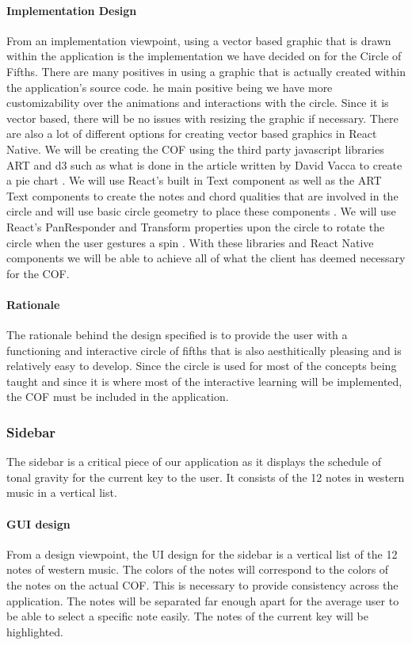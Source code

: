 \documentclass[onecolumn, draftclsnofoot,10pt, compsoc]{IEEEtran}
\begin{document}
\paragraph{Implementation Design}
From an implementation viewpoint, using a vector based graphic that is drawn within the application is the implementation we have decided on for the Circle of Fifths.
There are many positives in using a graphic that is actually created within the application's source code.
he main positive being we have more customizability over the animations and interactions with the circle.
Since it is vector based, there will be no issues with resizing the graphic if necessary.
There are also a lot of different options for creating vector based graphics in React Native.
We will be creating the COF using the third party javascript libraries ART and d3 such as what is done in the article written by David Vacca to create a pie chart \cite{medium}.
We will use React’s built in Text component as well as the ART Text components to create the notes and chord qualities that are involved in the circle and will use basic circle geometry to place these components \cite{react-text} \cite{seb}.
We will use React’s PanResponder and Transform properties upon the circle to rotate the circle when the user gestures a spin \cite{react-pan} \cite{react-transforms}.
With these libraries and React Native components we will be able to achieve all of what the client has deemed necessary for the COF.

\paragraph{Rationale}
The rationale behind the design specified is to provide the user with a functioning and interactive circle of fifths that is also aesthitically pleasing and is relatively easy to develop.
Since the circle is used for most of the concepts being taught and since it is where most of the interactive learning will be implemented, the COF must be included in the application.

\subsubsection{Sidebar}
The sidebar is a critical piece of our application as it displays the schedule of tonal gravity for the current key to the user.
It consists of the 12 notes in western music in a vertical list.

\paragraph{GUI design}
From a design viewpoint, the UI design for the sidebar is a vertical list of the 12 notes of western music.
The colors of the notes will correspond to the colors of the notes on the actual COF.
This is necessary to provide consistency across the application.
The notes will be separated far enough apart for the average user to be able to select a specific note easily.
The notes of the current key will be highlighted.
\end{document}

